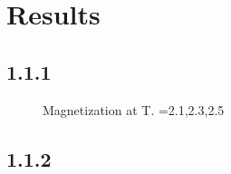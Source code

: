 \section{Results}

\subsection{1.1.1}

\begin{figure}[H]
    \centering
    \resizebox{\columnwidth}{!}{}
    \caption{Magnetization at T. =2.1,2.3,2.5}
    \label{fig:Mag_21-23-25}
\end{figure}


\subsection{1.1.2}

